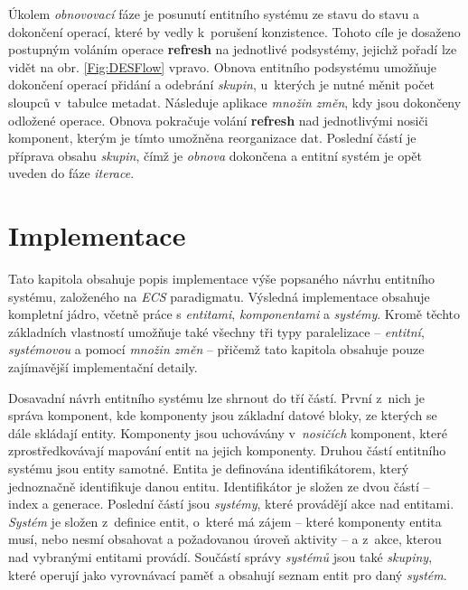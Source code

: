 Úkolem \emph{obnovovací} fáze je posunutí entitního systému ze stavu  do stavu  a dokončení operací, které by vedly k~porušení konzistence. Tohoto cíle je dosaženo postupným voláním operace \textbf{refresh} na jednotlivé podsystémy, jejichž pořadí lze vidět na obr. \ref{Fig:DESFlow} vpravo. Obnova entitního podsystému umožňuje dokončení operací přidání a odebrání \emph{skupin}, u~kterých je nutné měnit počet sloupců v~tabulce metadat. Následuje aplikace \emph{množin změn}, kdy jsou dokončeny odložené operace. Obnova pokračuje volání \textbf{refresh} nad jednotlivými nosiči komponent, kterým je tímto umožněna reorganizace dat. Poslední částí je příprava obsahu \emph{skupin}, čímž je \emph{obnova} dokončena a entitní systém je opět uveden do fáze \emph{iterace}.

\chapter{Implementace}
\label{Chap:Implementation}

Tato kapitola obsahuje popis implementace výše popsaného návrhu entitního systému, založeného na \emph{ECS} paradigmatu. Výsledná implementace obsahuje kompletní jádro, včetně práce s \emph{entitami}, \emph{komponentami} a \emph{systémy}. Kromě těchto základních vlastností umožňuje také všechny tři typy paralelizace -- \emph{entitní}, \emph{systémovou} a pomocí \emph{množin změn} -- přičemž tato kapitola obsahuje pouze zajímavější implementační detaily.



Dosavadní návrh entitního systému lze shrnout do tří částí. První z~nich je správa komponent, kde komponenty jsou základní datové bloky, ze kterých se dále skládají entity. Komponenty jsou uchovávány v~\emph{nosičích} komponent, které zprostředkovávají mapování entit na jejich komponenty. Druhou částí entitního systému jsou entity samotné. Entita je definována identifikátorem, který jednoznačně identifikuje danou entitu. Identifikátor je složen ze dvou částí -- index a generace. Poslední částí jsou \emph{systémy}, které provádějí akce nad entitami. \emph{Systém} je složen z~definice entit, o~které má zájem -- které komponenty entita musí, nebo nesmí obsahovat a požadovanou úroveň aktivity -- a z~akce, kterou nad vybranými entitami provádí. Součástí správy \emph{systémů} jsou také \emph{skupiny}, které operují jako vyrovnávací paměť a obsahují seznam entit pro daný \emph{systém}. 



